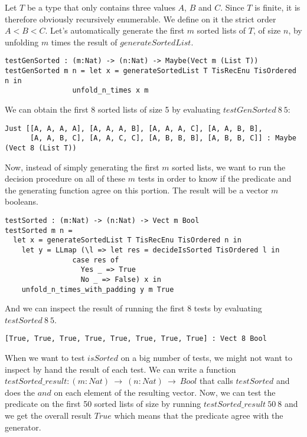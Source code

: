Let $T$ be a type that only contains three values $A$, $B$ and $C$. Since $T$ is finite, it is therefore obviously recursively enumerable. We define on it the strict order $A < B < C$.
Let's automatically generate the first $m$ sorted lists of $T$, of size $n$, by unfolding $m$ times the result of $generateSortedList$.


\begin{lstlisting}
testGenSorted : (m:Nat) -> (n:Nat) -> Maybe(Vect m (List T))
testGenSorted m n = let x = generateSortedList T TisRecEnu TisOrdered n in
		      	unfold_n_times x m
\end{lstlisting}

We can obtain the first 8 sorted lists of size 5 by evaluating $testGenSorted\ 8\ 5$:

\begin{lstlisting}
Just [[A, A, A, A], [A, A, A, B], [A, A, A, C], [A, A, B, B],
      [A, A, B, C], [A, A, C, C], [A, B, B, B], [A, B, B, C]] : Maybe (Vect 8 (List T))
\end{lstlisting}

Now, instead of simply generating the first $m$ sorted lists, we want to run the decision procedure on all of these $m$ tests in order to know if the predicate and the generating function agree on this portion. The result will be a vector $m$ booleans.

\begin{lstlisting}
testSorted : (m:Nat) -> (n:Nat) -> Vect m Bool
testSorted m n = 
  let x = generateSortedList T TisRecEnu TisOrdered n in
    let y = LLmap (\l => let res = decideIsSorted TisOrdered l in
			    case res of
			      Yes _ => True
			      No _ => False) x in
	unfold_n_times_with_padding y m True
\end{lstlisting}

And we can inspect the result of running the first 8 tests by evaluating $testSorted\ 8\ 5$.

\begin{lstlisting}
[True, True, True, True, True, True, True, True] : Vect 8 Bool
\end{lstlisting}

When we want to test $isSorted$ on a big number of tests, we might not want to inspect by hand the result of each test. We can write a function $testSorted\_result : (m:Nat)\ \rightarrow\ (n:Nat)\ \rightarrow\ Bool$ that calls $testSorted$ and does the $and$ on each element of the resulting vector. Now, we can test the predicate on the first 50 sorted lists of size by running $testSorted\_result\ 50\ 8$ and we get the overall result $True$ which means that the predicate agree with the generator.

